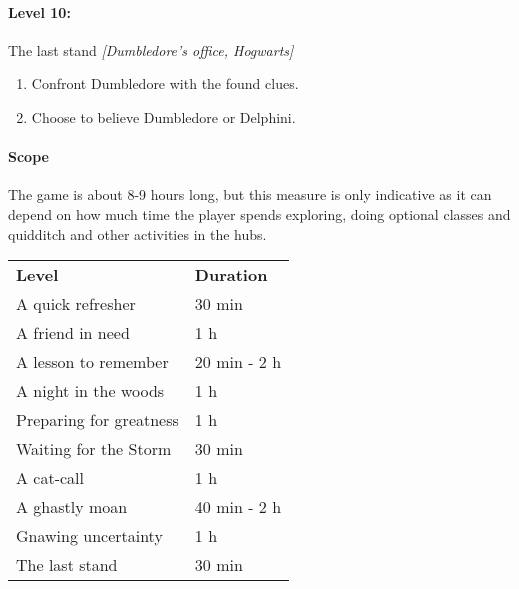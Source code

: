 \paragraph{Level 10:} The last stand \textit{[Dumbledore's office, Hogwarts]}
\begin{enumerate}[1)]
	\item Confront Dumbledore with the found clues.
	\item Choose to believe Dumbledore or Delphini.
\end{enumerate}

\clearpage

\paragraph{Scope}

The game is about 8-9 hours long, but this measure is only indicative as it can depend on how much time the player spends exploring, doing optional classes and quidditch and other activities in the hubs.

\begin{table}[htb]
	\begin{tabular}{ll}
		\textbf{Level} & \textbf{Duration} \\
		A quick refresher & 30 min \\
		A friend in need & 1 h \\
		A lesson to remember & 20 min - 2 h \\
		A night in the woods & 1 h \\
		Preparing for greatness & 1 h \\
		Waiting for the Storm & 30 min \\
		A cat-call & 1 h \\
		A ghastly moan & 40 min - 2 h \\
		Gnawing uncertainty & 1 h \\
		 The last stand & 30 min 
	\end{tabular}
\end{table}

\pagebreak